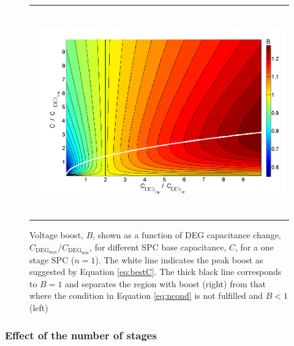 \begin{figure}[ht]
\begin{center}
\begin{tabular}{c}
\includegraphics[height=9cm]{fig03/boostmap2.png}\\
\end{tabular}
\end{center}
\caption 
{ \label{fig:boost}
Voltage boost, $B$, shown as a function of DEG capacitance change, $C_{\text{DEG}_{\max}}/C_{\text{DEG}_{\min}}$, for different SPC base capacitance, $C$, for a one stage SPC ($n=1$). The white line indicates the peak boost as suggested by Equation \ref{eq:bestC}. The thick black line corresponds to $B=1$ and separates the region with boost (right) from that where the condition in Equation \ref{eq:ncond} is not fulfilled  and $B<1$ (left)}
\end{figure}



\subsubsection{Effect of the number of stages}

